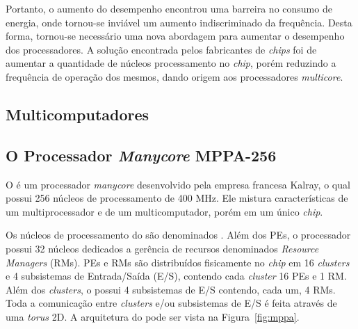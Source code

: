 Portanto, o aumento do desempenho encontrou uma barreira no consumo de energia, onde tornou-se inviável
um aumento indiscriminado da frequência. Desta forma, tornou-se necessário uma
nova abordagem para aumentar o desempenho dos processadores. A solução encontrada
pelos fabricantes de \textit{chips} foi de aumentar a quantidade de núcleos processamento no \textit{chip},
porém reduzindo a frequência de operação dos mesmos, dando origem aos processadores \textit{multicore}.



\subsection{Multicomputadores}





\subsection{O Processador \textit{Manycore} MPPA-256}

O \mppa é um processador \textit{manycore} desenvolvido pela empresa francesa
Kalray, o qual possui 256 núcleos de processamento de 400 MHz. Ele mistura características
de um multiprocessador e de um multicomputador, porém em um único \textit{chip}.

Os núcleos de processamento do \mppa são denominados \pes.
Além dos PEs, o processador possui 32 núcleos dedicados a gerência de recursos
denominados \textit{Resource Managers} (RMs). PEs e RMs são distribuídos
fisicamente no \textit{chip} em 16 \textit{clusters} e 4 subsistemas de
Entrada/Saída (E/S), contendo cada \textit{cluster} 16 PEs e 1 RM. Além dos
\textit{clusters}, o \mppa possui 4 subsistemas de E/S contendo, cada um, 4 RMs.
Toda a comunicação entre \textit{clusters} e/ou subsistemas de E/S é feita
através de uma \noc \textit{torus} 2D. A arquitetura do \mppa pode ser vista na
Figura~\ref{fig:mppa}.

